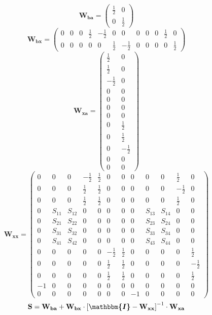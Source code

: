 \documentclass[10pt]{article} \usepackage{amsmath} \usepackage{bbold}
\begin{document}
\[ \mathbf{W_{ba}} = \left(\begin{smallmatrix} \frac{1}{2} & 0 \\ 0 &
\frac{1}{2} \end{smallmatrix}\right) \]
\[ \mathbf{W_{bx}} = \left(\begin{smallmatrix} 0 & 0 & 0 & \frac{1}{2}
& -\frac{1}{2} & 0 & 0 & 0 & 0 & 0 & \frac{1}{2} & 0 \\ 0 & 0 & 0 & 0
& 0 & \frac{1}{2} & -\frac{1}{2} & 0 & 0 & 0 & 0 & \frac{1}{2}
\end{smallmatrix}\right) \]
\[ \mathbf{W_{xa}} = \left(\begin{smallmatrix} \frac{1}{2} & 0 \\
\frac{1}{2} & 0 \\ -\frac{1}{2} & 0 \\ 0 & 0 \\ 0 & 0 \\ 0 & 0 \\ 0 &
0 \\ 0 & \frac{1}{2} \\ 0 & \frac{1}{2} \\ 0 & -\frac{1}{2} \\ 0 & 0
\\ 0 & 0 \end{smallmatrix}\right) \]
\[ \mathbf{W_{xx}} = \left(\begin{smallmatrix} 0 & 0 & 0 &
-\frac{1}{2} & \frac{1}{2} & 0 & 0 & 0 & 0 & 0 & \frac{1}{2} & 0 \\ 0
& 0 & 0 & \frac{1}{2} & \frac{1}{2} & 0 & 0 & 0 & 0 & 0 & -\frac{1}{2}
& 0 \\ 0 & 0 & 0 & \frac{1}{2} & \frac{1}{2} & 0 & 0 & 0 & 0 & 0 &
\frac{1}{2} & 0 \\ 0 & S_{11} & S_{12} & 0 & 0 & 0 & 0 & 0 & S_{13} &
S_{14} & 0 & 0 \\ 0 & S_{21} & S_{22} & 0 & 0 & 0 & 0 & 0 & S_{23} &
S_{24} & 0 & 0 \\ 0 & S_{31} & S_{32} & 0 & 0 & 0 & 0 & 0 & S_{33} &
S_{34} & 0 & 0 \\ 0 & S_{41} & S_{42} & 0 & 0 & 0 & 0 & 0 & S_{43} &
S_{44} & 0 & 0 \\ 0 & 0 & 0 & 0 & 0 & -\frac{1}{2} & \frac{1}{2} & 0 &
0 & 0 & 0 & \frac{1}{2} \\ 0 & 0 & 0 & 0 & 0 & \frac{1}{2} &
\frac{1}{2} & 0 & 0 & 0 & 0 & -\frac{1}{2} \\ 0 & 0 & 0 & 0 & 0 &
\frac{1}{2} & \frac{1}{2} & 0 & 0 & 0 & 0 & \frac{1}{2} \\ -1 & 0 & 0
& 0 & 0 & 0 & 0 & 0 & 0 & 0 & 0 & 0 \\ 0 & 0 & 0 & 0 & 0 & 0 & 0 & -1
& 0 & 0 & 0 & 0 \end{smallmatrix}\right) \]
\[ \mathbf{S}=\mathbf{W_{ba}}+\mathbf{W_{bx}}\cdot\left[
\boldsymbol{\mathbbm{I}}
-\mathbf{W_{xx}}\right]^{-1}\cdot\mathbf{W_{xa}} \]
\end{document}
